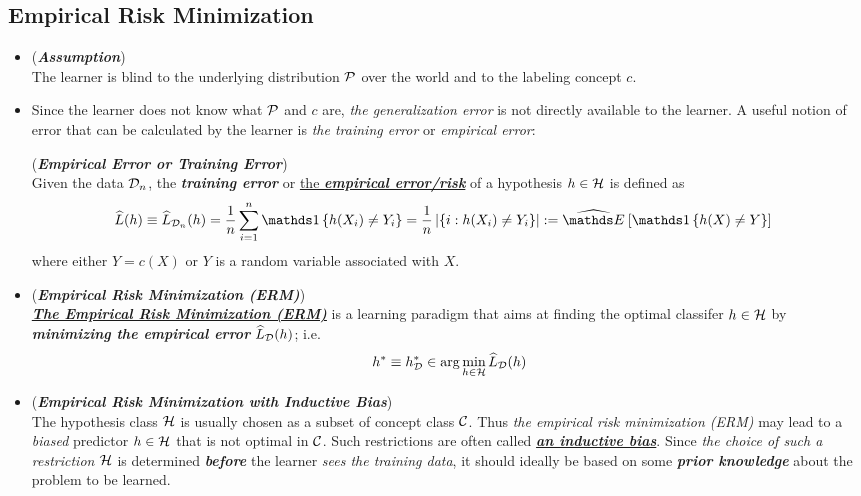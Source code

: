\documentclass[11pt]{article}
\begin{document}
\subsection{Empirical Risk Minimization}
\begin{itemize}
\item \begin{remark} (\textbf{\emph{Assumption}})\\
The learner is blind to the underlying distribution ${\mathcal P}$ over the world and to the labeling concept $c$. 
\end{remark}

\item  Since the learner does not know what ${\mathcal P}$ and $c$ are, \emph{the generalization error} is not directly available to the learner. A useful notion of error that can be calculated by the learner is \emph{the training error} or \emph{empirical error}: 
\begin{definition} (\emph{\textbf{Empirical Error or Training Error}}) \\
Given the data ${\mathcal D}_n$, the \emph{\textbf{training error}} or \underline{the \emph{\textbf{empirical error/risk}}} of a hypothesis $h \in {\mathcal H}$ is defined as 
\begin{align*}
\widehat{L}(h)   \equiv \widehat{L}_{\cD_n}(h)  &= \frac{1}{n}\sum_{i=1}^{n}\ind{h(X_i)\neq Y_i} = \frac{1}{n}\abs{\set{i: h(X_i)\neq Y_i}} := \Em{}{\ind{h(X) \neq Y}}
\end{align*} where either $Y = c(X)$ or $Y$ is a random variable associated with $X$.
\end{definition}

\item \begin{definition} (\textbf{\emph{Empirical Risk Minimization (ERM)}}) \\
\underline{\emph{\textbf{The Empirical Risk Minimization (ERM)}}} is a learning paradigm that aims at finding the optimal classifer $h \in {\mathcal H}$ by \emph{\textbf{minimizing the empirical error}} $\widehat{L}_{{\mathcal D}}(h)$; i.e.
\begin{align*}
h^{*} \equiv h^{*}_{{\mathcal D}} \in \arg\min_{h \in {\mathcal H}}\widehat{L}_{{\mathcal D}}(h)
\end{align*}
\end{definition}

\item \begin{remark} (\textbf{\emph{Empirical Risk Minimization with Inductive Bias}}) \\
The hypothesis class ${\mathcal H}$ is usually chosen as a subset of concept class ${\mathcal C}$. Thus \emph{the empirical risk minimization (ERM)} may lead to a \emph{biased} predictor $h \in {\mathcal H}$ that is not optimal in ${\mathcal C}$. Such restrictions are often called \underline{\emph{\textbf{an inductive bias}}}.  Since \emph{the choice of such a restriction ${\mathcal H}$} is determined \emph{\textbf{before}} the learner \emph{sees the training data}, it should ideally be based on some \emph{\textbf{prior knowledge}} about the problem to be learned. 
\end{remark}


\end{itemize}
\end{document}
